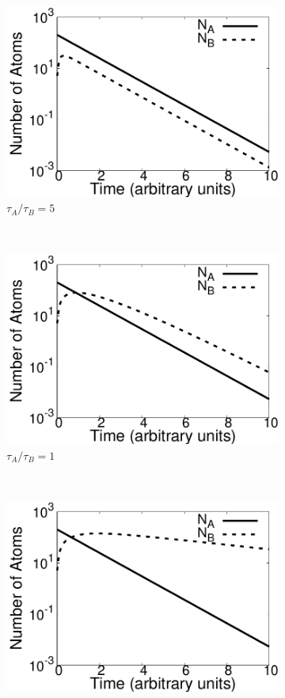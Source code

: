 \documentclass[pra,twocolumn,showpacs,amsmath,amssymb]{revtex4-1}
\begin{document}
 \begin{figure}
   \begin{subfigure}{.7\linewidth}
     \includegraphics[width=\linewidth]{t_gt_1.pdf}
     \caption{$\tau_A / \tau_B=5$}
     \label{fig:tau_gt_1}
   \end{subfigure}
 ~
   \begin{subfigure}{.7\linewidth}
     \includegraphics[width=\linewidth]{t_eq_1.pdf}
     \caption{$\tau_A / \tau_B=1$}
     \label{fig:tau_eq_1}
   \end{subfigure}
 ~
   \begin{subfigure}{.7\linewidth}
     \includegraphics[width=\linewidth]{t_lt_1.pdf}

\end{subfigure}
\end{figure}
\end{document}
